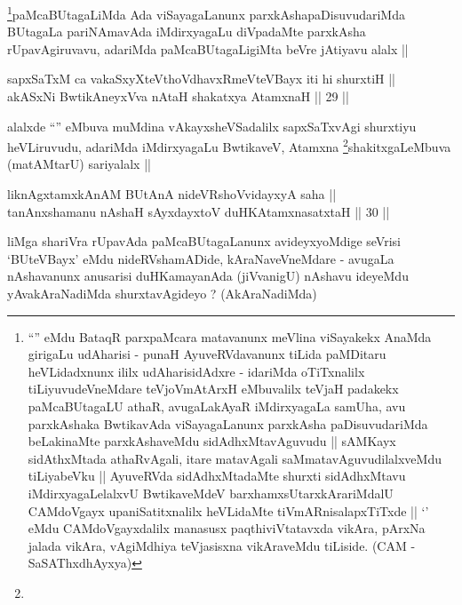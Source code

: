 \begin{artha}
\footnote[2]{``\stext'' eMdu BataqR parxpaMcara matavanunx meVlina
  viSayakekx AnaMda girigaLu udAharisi - punaH AyuveRVdavanunx tiLida
  paMDitaru heVLidadxnunx ililx udAharisidAdxre - 
\stext 
idariMda oTiTxnalilx tiLiyuvudeVneMdare teVjoVmAtArxH eMbuvalilx
teVjaH padakekx paMcaBUtagaLU athaR, avugaLakAyaR iMdirxyagaLa samUha,
avu parxkAshaka BwtikavAda viSayagaLanunx parxkAsha paDisuvudariMda
beLakinaMte parxkAshaveMdu sidAdhxMtavAguvudu || sAMKayx sidAthxMtada
athaRvAgali, itare matavAgali saMmatavAguvudilalxveMdu tiLiyabeVku ||
AyuveRVda sidAdhxMtadaMte shurxti sidAdhxMtavu iMdirxyagaLelalxvU
BwtikaveMdeV barxhamxsUtarxkArariMdalU CAMdoVgayx upaniSatitxnalilx
heVLidaMte tiVmARnisalapxTiTxde || `\stext' eMdu CAMdoVgayxdalilx
manasusx paqthiviVtatavxda vikAra, pArxNa jalada vikAra, vAgiMdhiya
teVjasisxna vikAraveMdu tiLiside. (CAM - SaSAThxdhAyxya)}paMcaBUtagaLiMda Ada viSayagaLanunx
parxkAshapaDisuvudariMda BUtagaLa pariNAmavAda iMdirxyagaLu diVpadaMte
parxkAsha rUpavAgiruvavu, adariMda paMcaBUtagaLigiMta beVre jAtiyavu
alalx ||
\end{artha}


\begin{shl}
sapxSaTxM ca vakaSxyXteV\s thoVdhavxRmeVteVBayx iti hi shurxtiH || \\
akASxNi BwtikAneyxVva nAtaH shakatxya AtamxnaH ||  29 ||  
\end{shl}

\begin{artha}
alalxde ``\stext'' eMbuva muMdina vAkayxsheVSadalilx sapxSaTxvAgi
shurxtiyu heVLiruvudu, adariMda iMdirxyagaLu BwtikaveV,
Atamxna \footnote[1]{}shakitxgaLeMbuva (matAMtarU) sariyalalx ||
\end{artha}


\begin{shl}
liknAgxtamxkAnAM BUtAnA nideVRshoV\s vidayxyA saha || \\
tanAnxshamanu nAshaH sAyxdayxtoV duHKAtamxnasatxtaH ||  30 ||  
\end{shl}

\begin{artha}
liMga shariVra rUpavAda paMcaBUtagaLanunx avideyxyoMdige seVrisi
`BUteVBayx' eMdu nideRVshamADide, kAraNaveVneMdare - avugaLa
nAshavanunx anusarisi duHKamayanAda (jiVvanigU) nAshavu ideyeMdu
yAvakAraNadiMda shurxtavAgideyo ? (AkAraNadiMda)
\end{artha}

